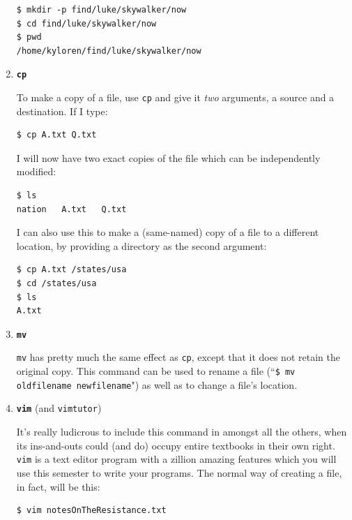 \begin{enumerate}
\begin{verbatim}
$ mkdir -p find/luke/skywalker/now
$ cd find/luke/skywalker/now
$ pwd
/home/kyloren/find/luke/skywalker/now
\end{verbatim}

\bigline

\item \textbf{\texttt{cp}}

To make a copy of a file, use \texttt{cp} and give it \textit{two} arguments,
a source and a destination. If I type:

\begin{verbatim}
$ cp A.txt Q.txt
\end{verbatim}

I will now have two exact copies of the file which can be independently
modified:

\begin{verbatim}
$ ls
nation   A.txt   Q.txt
\end{verbatim}

I can also use this to make a (same-named) copy of a file to a different
location, by providing a directory as the second argument:

\begin{verbatim}
$ cp A.txt /states/usa
$ cd /states/usa
$ ls
A.txt
\end{verbatim}

\bigline

\item \textbf{\texttt{mv}}

\texttt{mv} has pretty much the same effect as \texttt{cp}, except that it
does not retain the original copy. This command can be used to rename a file
(``\texttt{\$ mv oldfilename newfilename}") as well as to change a file's
location.

\bigline

\item \textbf{\texttt{vim}} (and \texttt{vimtutor})

It's really ludicrous to include this command in amongst all the others, when
its ins-and-outs could (and do) occupy entire textbooks in their own right.
\texttt{vim} is a text editor program with a zillion amazing features which
you will use this semester to write your programs. The normal way of creating
a file, in fact, will be this:

\begin{verbatim}
$ vim notesOnTheResistance.txt
\end{verbatim}


\end{enumerate}
